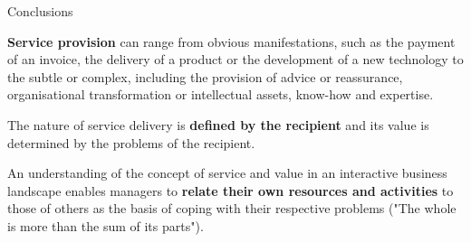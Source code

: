 \documentclass{beamer}
\begin{document}
\begin{frame}{Conclusions}

\textbf{Service provision} can range from obvious manifestations, such as the
payment of an invoice, the delivery of a product or the development of a new
technology to the subtle or complex, including the provision of advice or
reassurance, organisational transformation or intellectual assets, know-how
and expertise.

The nature of service delivery is \textbf{deﬁned by the recipient} and its
value is determined by the problems of the recipient.

An understanding of the concept of service and value in an interactive
business landscape enables managers to \textbf{relate their own resources and
  activities} to those of others as the basis of coping with their respective
problems ("The whole is more than the sum of its parts").
  
\end{frame}
  
  
\end{document}
